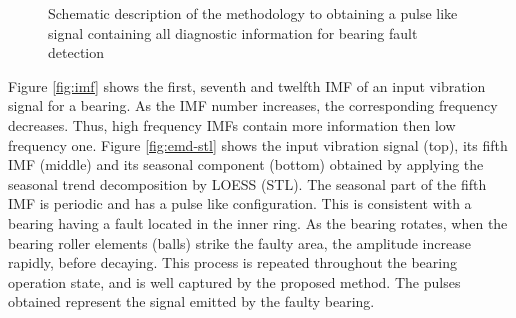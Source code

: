 \documentclass[../Main/thesis.tex]{subfiles}
\begin{document}
\begin{figure}[H]
  \caption{Schematic description of the methodology to obtaining a pulse like signal containing all diagnostic information for bearing fault detection}
   \label{fig:pulse}
\end{figure}
\justify
Figure \ref{fig:imf} shows the first, seventh and twelfth IMF of an input vibration signal for a bearing. As the IMF number increases, the corresponding frequency decreases. Thus, high frequency IMFs contain more information then low frequency one. Figure \ref{fig:emd-stl} shows  the input vibration signal (top), its fifth IMF (middle) and its seasonal component (bottom) obtained by applying the seasonal trend decomposition by LOESS (STL).   
\justify
The seasonal part of the fifth IMF is periodic and has a pulse like configuration. This is consistent with a bearing having a fault located in the inner ring. As the bearing rotates, when the bearing roller elements (balls) strike the faulty area, the amplitude increase rapidly, before decaying. This process is repeated throughout the bearing operation state, and is well captured by the proposed method. The pulses obtained represent the signal emitted by the faulty bearing.
\end{document}
